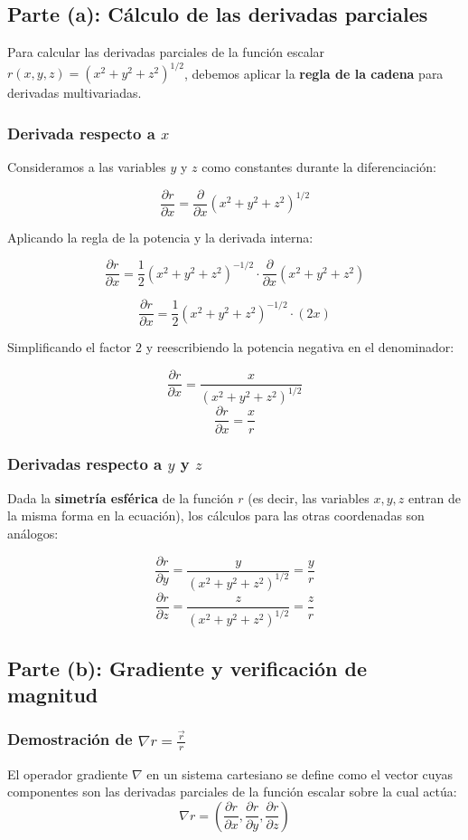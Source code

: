 \documentclass[a4paper]{article}
\begin{document}
\subsection{Parte (a): Cálculo de las derivadas parciales}

Para calcular las derivadas parciales de la función escalar $r(x, y, z) = (x^2 + y^2 + z^2)^{1/2}$, debemos aplicar la \textbf{regla de la cadena} para derivadas multivariadas.

\subsubsection{Derivada respecto a $x$}
Consideramos a las variables $y$ y $z$ como constantes durante la diferenciación:

$$ \frac{\partial r}{\partial x} = \frac{\partial}{\partial x} (x^2 + y^2 + z^2)^{1/2} $$

Aplicando la regla de la potencia y la derivada interna:

$$ \frac{\partial r}{\partial x} = \frac{1}{2} (x^2 + y^2 + z^2)^{-1/2} \cdot \frac{\partial}{\partial x} (x^2 + y^2 + z^2) $$

$$ \frac{\partial r}{\partial x} = \frac{1}{2} (x^2 + y^2 + z^2)^{-1/2} \cdot (2x) $$

Simplificando el factor $2$ y reescribiendo la potencia negativa en el denominador:

$$ \frac{\partial r}{\partial x} = \frac{x}{(x^2 + y^2 + z^2)^{1/2}} $$
$$\frac{\partial r}{\partial x} = \frac{x}{r} $$

\subsubsection{Derivadas respecto a $y$ y $z$}
Dada la \textbf{simetría esférica} de la función $r$ (es decir, las variables $x, y, z$ entran de la misma forma en la ecuación), los cálculos para las otras coordenadas son análogos:

$$ \frac{\partial r}{\partial y} = \frac{y}{(x^2 + y^2 + z^2)^{1/2}} = \frac{y}{r} $$
$$ \frac{\partial r}{\partial z} = \frac{z}{(x^2 + y^2 + z^2)^{1/2}} = \frac{z}{r} $$

\subsection{Parte (b): Gradiente y verificación de magnitud}

\subsubsection{Demostración de $\nabla r = \frac{\vec{r}}{r}$}
El operador gradiente $\nabla$ en un sistema cartesiano se define como el vector cuyas componentes son las derivadas parciales de la función escalar sobre la cual actúa:
$$ \nabla r = \left( \frac{\partial r}{\partial x}, \frac{\partial r}{\partial y}, \frac{\partial r}{\partial z} \right) $$
\end{document}
